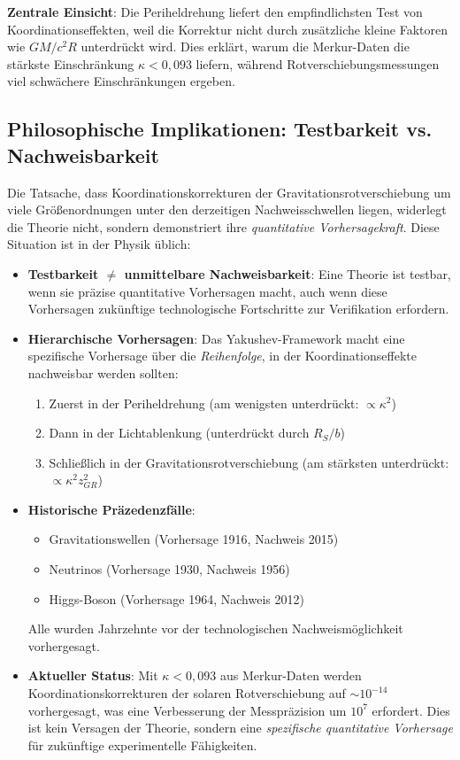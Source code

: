 \documentclass[11pt,a4paper]{article}
\begin{document}
	\textbf{Zentrale Einsicht}: Die Periheldrehung liefert den empfindlichsten Test von Koordinationseffekten, weil die Korrektur nicht durch zusätzliche kleine Faktoren wie $GM/c^2R$ unterdrückt wird. Dies erklärt, warum die Merkur-Daten die stärkste Einschränkung $\kappa < 0,093$ liefern, während Rotverschiebungsmessungen viel schwächere Einschränkungen ergeben.
	
	\subsection{Philosophische Implikationen: Testbarkeit vs. Nachweisbarkeit}
	\label{subsec:philosophy-testability}
	
	Die Tatsache, dass Koordinationskorrekturen der Gravitationsrotverschiebung um viele Größenordnungen unter den derzeitigen Nachweisschwellen liegen, widerlegt die Theorie nicht, sondern demonstriert ihre \emph{quantitative Vorhersagekraft}. Diese Situation ist in der Physik üblich:
	
	\begin{itemize}
		\item \textbf{Testbarkeit $\neq$ unmittelbare Nachweisbarkeit}: Eine Theorie ist testbar, wenn sie präzise quantitative Vorhersagen macht, auch wenn diese Vorhersagen zukünftige technologische Fortschritte zur Verifikation erfordern.
		
		\item \textbf{Hierarchische Vorhersagen}: Das Yakushev-Framework macht eine spezifische Vorhersage über die \emph{Reihenfolge}, in der Koordinationseffekte nachweisbar werden sollten:
		\begin{enumerate}
			\item Zuerst in der Periheldrehung (am wenigsten unterdrückt: $\propto \kappa^2$)
			\item Dann in der Lichtablenkung (unterdrückt durch $R_S/b$)
			\item Schließlich in der Gravitationsrotverschiebung (am stärksten unterdrückt: $\propto \kappa^2 z_{GR}^2$)
		\end{enumerate}
		
		\item \textbf{Historische Präzedenzfälle}:
		\begin{itemize}
			\item Gravitationswellen (Vorhersage 1916, Nachweis 2015)
			\item Neutrinos (Vorhersage 1930, Nachweis 1956)
			\item Higgs-Boson (Vorhersage 1964, Nachweis 2012)
		\end{itemize}
		Alle wurden Jahrzehnte vor der technologischen Nachweismöglichkeit vorhergesagt.
		
		\item \textbf{Aktueller Status}: Mit $\kappa < 0,093$ aus Merkur-Daten werden Koordinationskorrekturen der solaren Rotverschiebung auf $\sim 10^{-14}$ vorhergesagt, was eine Verbesserung der Messpräzision um $10^7$ erfordert. Dies ist kein Versagen der Theorie, sondern eine \emph{spezifische quantitative Vorhersage} für zukünftige experimentelle Fähigkeiten.
	\end{itemize}
	
\end{document}
